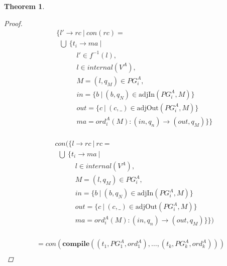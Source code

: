 \documentclass[twocolumn]{sig-alternate-10pt}
\newtheorem{thm}{Theorem}[section]
\begin{document}
\begin{thm}
\begin{proof}
  \[ \begin{array}{l}
     ~~~~~ \{ l' \rightarrow rc ~\vert~ con(rc) = \\
     ~~~~~~~ \bigcup~ \{ t_i \rightarrow ma ~\vert~ \\
     ~~~~~~~~~~~~~~~~~~ l' \in f^{-1}(l), \\
     ~~~~~~~~~~~~~~~~~~ l \in internal(V^A), \\
     ~~~~~~~~~~~~~~~~~~ M = (l,q_M) \in PG^A_i, \\
     ~~~~~~~~~~~~~~~~~~ in = \{ b ~\vert~ (b,q_N) \in \text{adjIn}(PG^A_i,M) \} \\
     ~~~~~~~~~~~~~~~~~~ out = \{ c ~\vert~ (c,\_) \in \text{adjOut}(PG^A_i,M) \} \\
     ~~~~~~~~~~~~~~~~~~ ma = ord^A_i(M) : (in,q_n) \rightarrow (out,q_M) \} \} \\
  \end{array} \]%

  \[ \begin{array}{l}
     ~~~~~ con(\{ l \rightarrow rc ~\vert~ rc = \\
     ~~~~~~~ \bigcup~ \{ t_i \rightarrow ma ~\vert~ \\
     ~~~~~~~~~~~~~~~~~~ l \in internal(V^A), \\
     ~~~~~~~~~~~~~~~~~~ M = (l,q_M) \in PG^A_i, \\
     ~~~~~~~~~~~~~~~~~~ in = \{ b ~\vert~ (b,q_N) \in \text{adjIn}(PG^A_i,M) \} \\
     ~~~~~~~~~~~~~~~~~~ out = \{ c ~\vert~ (c,\_) \in \text{adjOut}(PG^A_i,M) \} \\
     ~~~~~~~~~~~~~~~~~~ ma = ord^A_i(M) : (in,q_n) \rightarrow (out,q_M) \} \}) \\
  \end{array} \]%

  \[ \begin{array}{l}
     = con(\textbf{compile}( (t_1,PG^A_1,ord^A_1), \dots, (t_k,PG^A_k,ord^A_k) )) \\
  \end{array} \]%


  \end{proof}

\end{thm}
\end{document}
